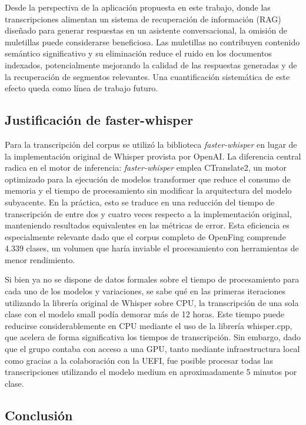 Desde la perspectiva de la aplicación propuesta en este trabajo, donde las transcripciones alimentan un sistema de recuperación de información (RAG) diseñado para generar respuestas en un asistente conversacional, la omisión de muletillas puede considerarse beneficiosa. Las muletillas no contribuyen contenido semántico significativo y su eliminación reduce el ruido en los documentos indexados, potencialmente mejorando la calidad de las respuestas generadas y de la recuperación de segmentos relevantes. Una cuantificación sistemática de este efecto queda como línea de trabajo futuro.

\subsection{Justificación de faster-whisper}
\label{subsection:6-1-faster-whisper}

Para la transcripción del corpus se utilizó la biblioteca \textit{faster-whisper} en lugar de la implementación original de Whisper provista por OpenAI. La diferencia central radica en el motor de inferencia: \textit{faster-whisper} emplea CTranslate2, un motor optimizado para la ejecución de modelos transformer que reduce el consumo de memoria y el tiempo de procesamiento sin modificar la arquitectura del modelo subyacente. En la práctica, esto se traduce en una reducción del tiempo de transcripción de entre dos y cuatro veces respecto a la implementación original, manteniendo resultados equivalentes en las métricas de error. Esta eficiencia es especialmente relevante dado que el corpus completo de OpenFing comprende 4.339 clases, un volumen que haría inviable el procesamiento con herramientas de menor rendimiento.

Si bien ya no se dispone de datos formales sobre el tiempo de procesamiento para cada uno de los modelos y variaciones, se sabe qué en las primeras iteraciones utilizando la librería original de Whisper sobre CPU, la transcripción de una sola clase con el modelo small podía demorar más de 12 horas. Este tiempo puede reducirse considerablemente en CPU mediante el uso de la librería whisper.cpp, que acelera de forma significativa los tiempos de transcripción. Sin embargo, dado que el grupo contaba con acceso a una GPU, tanto mediante infraestructura local como gracias a la colaboración con la UEFI, fue posible procesar todas las transcripciones utilizando el modelo medium en aproximadamente 5 minutos por clase.

\subsection{Conclusión}
\label{subsection:6-1-Conclusión}

